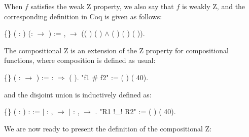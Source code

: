     When $f$ satisfies the weak Z property, we also say that $f$ is
    weakly Z, and the corresponding definition in Coq is given as
    follows: \begin{coqdoccode}
\coqdocemptyline
\coqdocnoindent
{}  \{\} ( :  ) (:  \ensuremath{\rightarrow} ) := \coqdockw{\ensuremath{\forall}}  ,    \ensuremath{\rightarrow} (( )  ( ) \ensuremath{\land} ( ) ( ) ( )).\coqdoceol
\coqdocemptyline
\end{coqdoccode}
The compositional Z is an extension of the Z property for
compositional functions, where composition is defined as usual: \begin{coqdoccode}
\coqdocemptyline
\coqdocnoindent
{}  \{\} ( :  \ensuremath{\rightarrow} ) :=  : \ensuremath{\Rightarrow}  ( ).\coqdoceol
\coqdocnoindent
{} "f1 \# f2" := (  ) (  40).\coqdoceol
\coqdocemptyline
\end{coqdoccode}
\noindent and the disjoint union is inductively defined as: \begin{coqdoccode}
\coqdocemptyline
\coqdocnoindent
{}  \{\} ( :  ) :   :=\coqdoceol
\coqdocnoindent
\ensuremath{|} : \coqdockw{\ensuremath{\forall}}  ,    \ensuremath{\rightarrow}     \coqdoceol
\coqdocnoindent
\ensuremath{|} : \coqdockw{\ensuremath{\forall}}  ,    \ensuremath{\rightarrow}     .\coqdoceol
\coqdocnoindent
{} "R1 !\_! R2" := (  ) (  40).\coqdoceol
\coqdocemptyline
\coqdocemptyline
\end{coqdoccode}
We are now ready to present the definition of the compositional Z:


